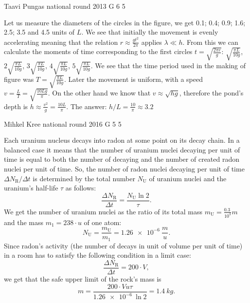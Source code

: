 \documentclass[11pt]{article}
\begin{document}
{Taavi Pungas} %
{national round} %
{2013} %
{G 6} %
{5} %
{

\ifEngSolution
Let us measure the diameters of the circles in the figure, we get 0.1; 0.4; 0.9; 1.6; 2.5; 3.5 and 4.5 units of $L$. We see that initially the movement is evenly accelerating meaning that the relation $r \approx \frac{gt^2}{2 \pi}$ applies $\lambda \ll h$. From this we can calculate the moments of time corresponding to the first circles $t = \sqrt{\frac{2 \pi r}{g}}$: $\sqrt{\frac{\pi L}{10 g}}$, $2 \sqrt{\frac{\pi L}{10 g}}$, $3 \sqrt{\frac{\pi L}{10 g}}$, $4 \sqrt{\frac{\pi L}{10 g}}$, $5 \sqrt{\frac{\pi L}{10 g}}$. We see that the time period used in the making of figure was $T=\sqrt{\frac{\pi L}{10 g}}$. Later the movement is uniform, with a speed $v=\frac{L}{T}=\sqrt{\frac{10 L g}{\pi}}$. On the other hand we know that $v \approx \sqrt{hg}$, therefore the pond's depth is $h \approx \frac{v^2}{g} = \frac{10 L}{\pi}$. The answer: $h/L = \frac{10}{\pi} \approx \SI{3,2}{}$
\fi
}

{Mihkel Kree} %
{national round} %
{2016} %
{G 5} %
{5} %
{

\ifEngSolution
Each uranium nucleus decays into radon at some point on its decay chain. In a balanced case it means that the number of uranium nuclei decaying per unit of time is equal to both the number of decaying and the number of created radon nuclei per unit of time. So, the number of radon nuclei decaying per unit of time $\Delta N_\text{R} / \Delta t$ is determined by the total number $N_\text{U}$ of uranium nuclei and the uranium's half-life $\tau$ as follows:
\[
\frac{\Delta N_\text{R}}{\Delta t} = \frac{N_\text{U} \ln 2}{\tau}.
\] 
We get the number of uranium nuclei as the ratio of its total mass $m_\text{U} = \frac{\SI{0.3}{}}{10^3} m$ and the mass $m_1=238 \cdot u$ of one atom:
\[
N_\text{U}=\frac{m_\text{U}}{m_1}=\SI{1.26e-6}{} \frac{m}{u}.
\] 
Since radon's activity (the number of decays in unit of volume per unit of time) in a room has to satisfy the following condition in a limit case:
\[
\frac{\Delta N_\text{R}}{\Delta t} = 200\cdot V,
\] 
we get that the safe upper limit of the rock's mass is
\[
m = \frac{200\cdot V u \tau}{\SI{1.26e-6}{}\ln 2}=\SI{1.4}{kg}.
\]
\fi
}
\end{document}
